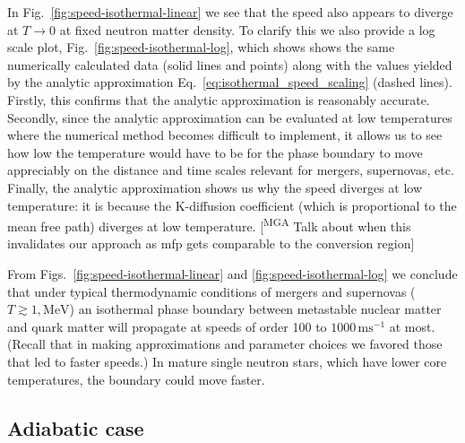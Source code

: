 \documentclass[10pt,superscriptaddress,
amsmath,aps,prc,twocolumn,nofootinbib,floatfix]{revtex4-1}
\newcommand{\mgacom}[1]{\textsf{\color[rgb]{0.8,0,0}[\textsuperscript{MGA} #1]}}
\newcommand{\m}{\text{m}}
\newcommand{\s}{\text{s}}
\newcommand{\MeV}{\text{MeV}}
\begin{document}
{In Fig.~\ref{fig:speed-isothermal-linear} we see that the speed also appears to diverge at $T\to 0$ at fixed neutron matter density. To clarify this we also provide a log scale plot, Fig.~\ref{fig:speed-isothermal-log}, which shows shows the same numerically calculated data (solid lines and points) along with the values yielded by the analytic approximation Eq.~\eqref{eq:isothermal_speed_scaling} (dashed lines). Firstly, this confirms that the analytic approximation is reasonably accurate. Secondly, since the analytic approximation can be evaluated at low temperatures where the numerical method becomes difficult to implement, it allows us to see how low the temperature would have to be for the phase boundary to move appreciably on the distance and time scales relevant for mergers, supernovas, etc.
Finally, the analytic approximation shows us why the speed diverges at low temperature: it is because the K-diffusion coefficient (which is proportional to the mean free path) diverges at low temperature.  \mgacom{Talk about when this invalidates our approach as mfp gets comparable to the conversion region}

From Figs.~\ref{fig:speed-isothermal-linear} and \ref{fig:speed-isothermal-log} we conclude that under typical thermodynamic conditions of mergers and supernovas ($T\gtrsim 1,\MeV$) an isothermal phase boundary between metastable nuclear matter and quark matter will propagate at speeds of order 100 to $1000\,\m\s^{-1}$ at most. (Recall that in making approximations and parameter choices we favored those that led to faster speeds.) In mature single neutron stars, which have lower core temperatures, the boundary could move faster.
}


\subsection{Adiabatic case}
\end{document}
